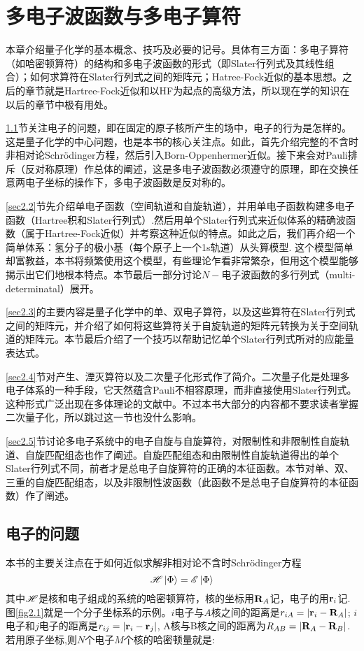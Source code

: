 
\chapter{多电子波函数与多电子算符}
\label{chap2}
本章介绍量子化学的基本概念、技巧及必要的记号。具体有三方面：多电子算符（如哈密顿算符）的结构和多电子波函数的形式（即Slater行列式及其线性组合）；如何求算符在Slater行列式之间的矩阵元；Hatree-Fock近似的基本思想。之后的章节就是Hartree-Fock近似和以HF为起点的高级方法，所以现在学的知识在以后的章节中极有用处。

\ref{sec2.1}节关注电子的问题，即在固定的原子核所产生的场中，电子的行为是怎样的。这是量子化学的中心问题，也是本书的核心关注点。如此，首先介绍完整的不含时非相对论Schr\"odinger方程，然后引入Born-Oppenhermer近似。接下来会对Pauli排斥（反对称原理）作总体的阐述，这是多电子波函数必须遵守的原理，即在交换任意两电子坐标的操作下，多电子波函数是反对称的。

\ref{sec2.2}节先介绍单电子函数（空间轨道和自旋轨道），并用单电子函数构建多电子函数（Hartree积和Slater行列式）.然后用单个Slater行列式来近似体系的精确波函数（属于Hartree-Fock近似）并考察这种近似的特点。如此之后，我们再介绍一个简单体系：氢分子的极小基（每个原子上一个1s轨道）从头算模型. 这个模型简单却富教益，本书将频繁使用这个模型，有些理论乍看非常繁杂，但用这个模型能够揭示出它们地根本特点。本节最后一部分讨论$N-$电子波函数的多行列式（multi-determinatal）展开。

\ref{sec2.3}的主要内容是量子化学中的单、双电子算符，以及这些算符在Slater行列式之间的矩阵元，并介绍了如何将这些算符关于自旋轨道的矩阵元转换为关于空间轨道的矩阵元。本节最后介绍了一个技巧以帮助记忆单个Slater行列式所对的应能量表达式。

\ref{sec2.4}节对产生、湮灭算符以及二次量子化形式作了简介。二次量子化是处理多电子体系的一种手段，它天然蕴含Pauli不相容原理，而非直接使用Slater行列式。这种形式广泛出现在多体理论的文献中。不过本书大部分的内容都不要求读者掌握二次量子化，所以跳过这一节也没什么影响。

\ref{sec2.5}节讨论多电子系统中的电子自旋与自旋算符，对限制性和非限制性自旋轨道、自旋匹配组态也作了阐述。自旋匹配组态和由限制性自旋轨道得出的单个Slater行列式不同，前者才是总电子自旋算符的正确的本征函数。本节对单、双、三重的自旋匹配组态，以及非限制性波函数（此函数不是总电子自旋算符的本征函数）作了阐述。

\section{电子的问题}
\label{sec2.1}
本书的主要关注点在于如何近似求解非相对论不含时Schr\"odinger方程
\begin{equation}
\label{2.1}
\mathscr{H}\Ket{\Phi}=\mathscr{E}\Ket{\Phi}
\end{equation}
其中$\mathscr{H}$是核和电子组成的系统的哈密顿算符，核的坐标用$\mathbf{R}_A$记，电子的用$\mathbf{r}_i$记. 图\ref{fig2.1}就是一个分子坐标系的示例。$i$电子与$A$核之间的距离是$r_{iA}=|\mathbf{r}_i-\mathbf{R}_A|$; $i$电子和$j$电子的距离是$r_{ij}=|\mathbf{r}_i-\mathbf{r}_j|$, A核与B核之间的距离为$R_{AB}=|\mathbf{R}_A-\mathbf{R}_B|$.若用原子坐标,则$N$个电子$M$个核的哈密顿量就是:

